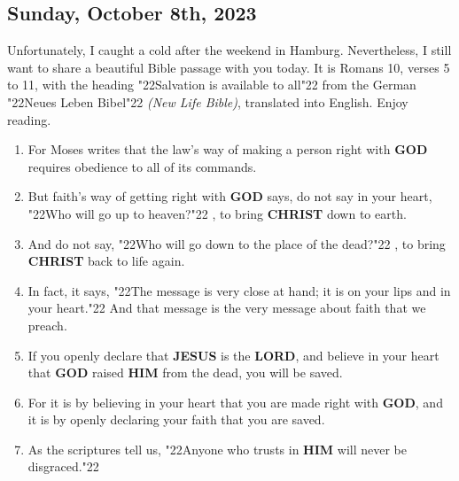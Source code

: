 \documentclass[10pt,a5paper]{article}
\newcommand{\Christ}[0]{\textbf{CHRIST}}
\newcommand{\God}[0]{\textbf{GOD}}
\newcommand{\Him}[0]{\textbf{HIM}}
\newcommand{\Jesus}[0]{\textbf{JESUS}}
\newcommand{\Lord}[0]{\textbf{LORD}}
\newcommand{\q}[1]{\char"22{#1}\char"22 }
\begin{document}
	\subsection{Sunday, October 8th, 2023}
		Unfortunately,
		I caught a cold after the weekend in Hamburg.
		Nevertheless,
		I still want to share a beautiful Bible passage with you today.
		It is Romans 10,
		verses 5 to 11,
		with the heading
		\q{Salvation is available to all}
		from the German \q{Neues Leben Bibel} \textit{(New Life Bible)},
		translated into English.
		Enjoy reading.
		\begin{enumerate}[nosep,start=5]
			\item	For Moses writes that the law’s way of making a person right with {\God} requires obedience to all of its commands.
			\item	But faith’s way of getting right with {\God} says,
					do not say in your heart,
					\q{Who will go up to heaven?},
					to bring {\Christ} down to earth.
			\item	And do not say,
					\q{Who will go down to the place of the dead?},
					to bring {\Christ} back to life again.
			\item	In fact,
					it says,
					\q{The message is very close at hand;
					it is on your lips and in your heart.}
					And that message is the very message about faith that we preach.
			\item	If you openly declare that {\Jesus} is the {\Lord},
					and believe in your heart that {\God} raised {\Him} from the dead,
					you will be saved.
			\item	For it is by believing in your heart that you are made right with {\God},
					and it is by openly declaring your faith that you are saved.
			\item	As the scriptures tell us,
					\q{Anyone who trusts in {\Him} will never be disgraced.}
		\end{enumerate}

	\newpage
\end{document}
